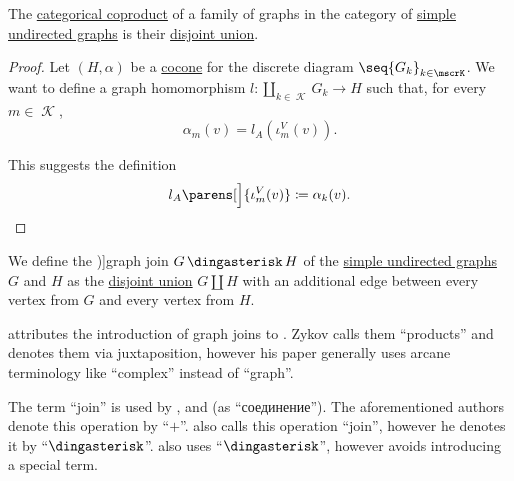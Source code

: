 \begin{proposition}\label{thm:undirected_graph_coproduct}
  The \hyperref[def:discrete_category_limits]{categorical coproduct} of a family of graphs in the category of \hyperref[def:undirected_graph]{simple undirected graphs} is their \hyperref[def:graph_disjoint_union]{disjoint union}.
\end{proposition}
\begin{proof}
  Let \( (H, \alpha) \) be a \hyperref[def:category_of_cones/cocone]{cocone} for the discrete diagram \( \seq{ G_k }_{k \in \mscrK} \). We want to define a graph homomorphism \( l: \coprod_{k \in \mscrK} G_k \to H \) such that, for every \( m \in \mscrK \),
  \begin{equation*}
    \alpha_m(v) = l_A(\iota^V_m(v)).
  \end{equation*}

  This suggests the definition
  \begin{equation*}
    l_A\parens[\Big]{ \iota^V_m(v) } \coloneqq \alpha_k(v).
  \end{equation*}
\end{proof}

\begin{definition}\label{def:graph_join}
  We define the \term[ru=соединение (графов) (\cite[265]{Новиков2013})]{graph join} \( G \Ast H \) of the \hyperref[def:undirected_graph]{simple undirected graphs} \( G \) and \( H \) as the \hyperref[def:graph_disjoint_union]{disjoint union} \( G \coprod H \) with an additional edge between every vertex from \( G \) and every vertex from \( H \).
\end{definition}
\begin{comments}
  \item {} attributes the introduction of graph joins to \cite[164]{Зыков1949}. Zykov calls them \enquote{products} and denotes them via juxtaposition, however his paper generally uses arcane terminology like \enquote{complex} instead of \enquote{graph}.

  The term \enquote{join} is used by ,  and  (as \enquote{соединение}). The aforementioned authors denote this operation by \enquote{\( + \)}.  also calls this operation \enquote{join}, however he denotes it by \enquote{\( \Ast \)}.  also uses \enquote{\( \Ast \)}, however avoids introducing a special term.
\end{comments}

